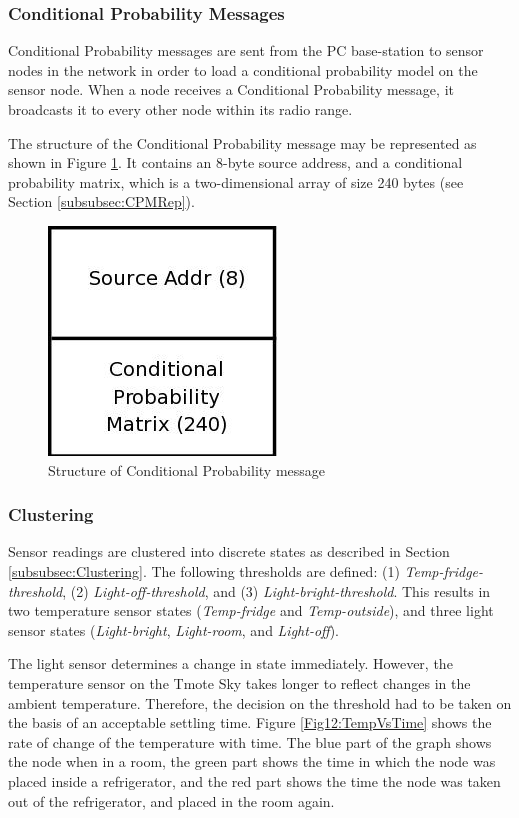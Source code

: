\documentclass{sig-alternate-10pt}
\begin{document}
\subsubsection*{Conditional Probability Messages}

Conditional Probability messages are sent from the PC base-station to sensor nodes in the network in order to load a conditional probability model on the sensor node. When a node receives a Conditional Probability message, it broadcasts it to every other node within its radio range.

The structure of the Conditional Probability message may be represented as shown in Figure \ref{Fig8:CondProbMsgStruct}. It contains an 8-byte source address, and a conditional probability matrix, which is a two-dimensional array of size 240 bytes (see Section \ref{subsubsec:CPMRep}).

\begin{figure}[h]
\centering
\includegraphics[scale=0.3]{img/CondProbMsgStruct.png}
\caption{Structure of Conditional Probability message} 
\label{Fig8:CondProbMsgStruct}
\end{figure}  

\subsubsection{Clustering} \label{subsubsec:clustering}

Sensor readings are clustered into discrete states as described in
Section \ref{subsubsec:Clustering}. The following thresholds are defined: (1)
\emph{Temp-fridge-threshold}, (2) \emph{Light-off-threshold}, and (3)
\emph{Light-bright-threshold}. This results in two temperature sensor states
(\emph{Temp-fridge} and \emph{Temp-outside}), and three light sensor states
(\emph{Light-bright}, \emph{Light-room}, and \emph{Light-off}).

The light sensor determines a change in state immediately. However, the temperature sensor on the Tmote Sky \cite{TmoteskyDataSheet:2007} takes longer to reflect changes in the ambient temperature. Therefore, the decision on the threshold had to be taken on the basis of an acceptable settling time. Figure \ref{Fig12:TempVsTime} shows the rate of change of the temperature with time. The blue part of the graph shows the node when in a room, the green part shows the time in which the node was placed inside a refrigerator, and the red part shows the time the node was taken out of the refrigerator, and placed in the room again.
\end{document}
